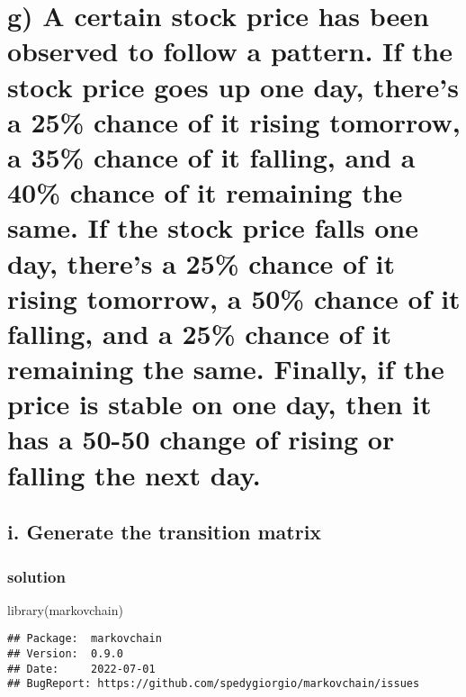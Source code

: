 \documentclass[
]{article}
\newenvironment{Shaded}{\begin{snugshade}}{\end{snugshade}}
\newcommand{\FunctionTok}[1]{\textcolor[rgb]{0.00,0.00,0.00}{#1}}
\newcommand{\NormalTok}[1]{#1}
\begin{document}
\hypertarget{g-a-certain-stock-price-has-been-observed-to-follow-a-pattern.-if-the-stock-price-goes-up-one-day-theres-a-25-chance-of-it-rising-tomorrow-a-35-chance-of-it-falling-and-a-40-chance-of-it-remaining-the-same.-if-the-stock-price-falls-one-day-theres-a-25-chance-of-it-rising-tomorrow-a-50-chance-of-it-falling-and-a-25-chance-of-it-remaining-the-same.-finally-if-the-price-is-stable-on-one-day-then-it-has-a-50-50-change-of-rising-or-falling-the-next-day.}{%
\section{g) A certain stock price has been observed to follow a pattern.
If the stock price goes up one day, there's a 25\% chance of it rising
tomorrow, a 35\% chance of it falling, and a 40\% chance of it remaining
the same. If the stock price falls one day, there's a 25\% chance of it
rising tomorrow, a 50\% chance of it falling, and a 25\% chance of it
remaining the same. Finally, if the price is stable on one day, then it
has a 50-50 change of rising or falling the next
day.}\label{g-a-certain-stock-price-has-been-observed-to-follow-a-pattern.-if-the-stock-price-goes-up-one-day-theres-a-25-chance-of-it-rising-tomorrow-a-35-chance-of-it-falling-and-a-40-chance-of-it-remaining-the-same.-if-the-stock-price-falls-one-day-theres-a-25-chance-of-it-rising-tomorrow-a-50-chance-of-it-falling-and-a-25-chance-of-it-remaining-the-same.-finally-if-the-price-is-stable-on-one-day-then-it-has-a-50-50-change-of-rising-or-falling-the-next-day.}}

\hypertarget{i.-generate-the-transition-matrix}{%
\subsection{i. Generate the transition
matrix}\label{i.-generate-the-transition-matrix}}

\hypertarget{solution-1}{%
\subsubsection{solution}\label{solution-1}}

\begin{Shaded}
\begin{Highlighting}[]
\FunctionTok{library}\NormalTok{(markovchain)}
\end{Highlighting}
\end{Shaded}

\begin{verbatim}
## Package:  markovchain
## Version:  0.9.0
## Date:     2022-07-01
## BugReport: https://github.com/spedygiorgio/markovchain/issues
\end{verbatim}
\end{document}
